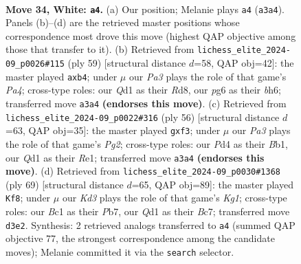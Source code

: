 \documentclass[11pt]{article}
\begin{document}
\clearpage

\begin{figure}[p]\centering
\begin{subfigure}{0.46\textwidth}\centering
\resizebox{\linewidth}{!}{%
\newchessgame
\chessboard[
  setfen={7r/r3k2p/1pp1p1p1/6P1/1p1P4/PP1KP3/R4bq1/2BQ4 w - - 1 34},
  showmover=false,
  pgfstyle=straightmove, color=movearrow, markmove={a3-a4}
]}
\caption{}
\end{subfigure}\hfill
\begin{subfigure}{0.46\textwidth}\centering
\resizebox{\linewidth}{!}{%
\newchessgame
\chessboard[
  setfen={3r2k1/7p/1p2q1pB/p1bp4/1P6/2PQ4/P5PP/5R1K b - - 0 30},
  showmover=false,
  pgfstyle=straightmove, color=movearrow, markmove={a5-b4}
]}
\caption{}
\end{subfigure}
\\[4pt]
\begin{subfigure}{0.46\textwidth}\centering
\resizebox{\linewidth}{!}{%
\newchessgame
\chessboard[
  setfen={5nk1/2q1rpp1/p6p/1p2P3/1P1Q4/P4b1P/5PP1/1B2R1K1 w - - 0 29},
  showmover=false,
  pgfstyle=straightmove, color=movearrow, markmove={g2-f3}
]}
\caption{}
\end{subfigure}\hfill
\begin{subfigure}{0.46\textwidth}\centering
\resizebox{\linewidth}{!}{%
\newchessgame
\chessboard[
  setfen={4r1k1/1pb2pp1/2p2q2/p4P2/P2PB1Qp/2P5/1P4K1/4R3 b - - 0 35},
  showmover=false,
  pgfstyle=straightmove, color=movearrow, markmove={g8-f8}
]}
\caption{}
\end{subfigure}
\caption{\textbf{Move 34, White: \texttt{a4}.} (a) Our position; Melanie plays \texttt{a4} (\texttt{a3a4}). Panels (b)--(d) are the retrieved master positions whose correspondence most drove this move (highest QAP objective among those that transfer to it). (b) Retrieved from \texttt{lichess\_elite\_2024-09\_p0026\#115} (ply 59) [structural distance $d$=58, QAP obj=42]: the master played \texttt{axb4}; under $\mu$ our \emph{Pa3} plays the role of that game's \emph{Pa4}; cross-type roles: our \emph{Q}d1 as their \emph{R}d8, our \emph{p}g6 as their \emph{b}h6; transferred move \texttt{a3a4} \textbf{(endorses this move)}. (c) Retrieved from \texttt{lichess\_elite\_2024-09\_p0022\#316} (ply 56) [structural distance $d$=63, QAP obj=35]: the master played \texttt{gxf3}; under $\mu$ our \emph{Pa3} plays the role of that game's \emph{Pg2}; cross-type roles: our \emph{P}d4 as their \emph{B}b1, our \emph{Q}d1 as their \emph{R}e1; transferred move \texttt{a3a4} \textbf{(endorses this move)}. (d) Retrieved from \texttt{lichess\_elite\_2024-09\_p0030\#1368} (ply 69) [structural distance $d$=65, QAP obj=89]: the master played \texttt{Kf8}; under $\mu$ our \emph{Kd3} plays the role of that game's \emph{Kg1}; cross-type roles: our \emph{B}c1 as their \emph{P}b7, our \emph{Q}d1 as their \emph{B}c7; transferred move \texttt{d3e2}. Synthesis: 2 retrieved analogs transferred to \texttt{a4} (summed QAP objective 77, the strongest correspondence among the candidate moves); Melanie committed it via the \texttt{search} selector.}
\label{fig:thought-m66}
\end{figure}
\end{document}
